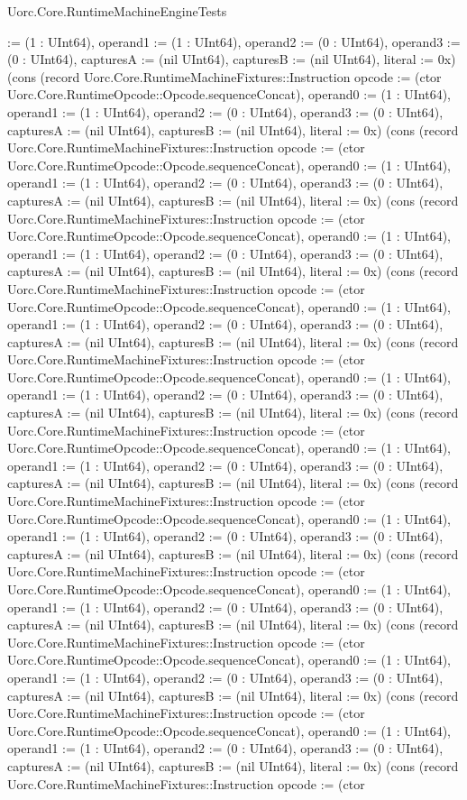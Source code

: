 \begin{lexlean}{Uorc.Core.RuntimeMachineEngineTests}
\begin{semanticmodule}
{:= (1 : UInt64), operand1 := (1 : UInt64), operand2 := (0 : UInt64), operand3 := (0 : UInt64), capturesA := (nil UInt64), capturesB := (nil UInt64), literal := 0x}) (cons (record Uorc.Core.RuntimeMachineFixtures::Instruction {opcode := (ctor Uorc.Core.RuntimeOpcode::Opcode.sequenceConcat), operand0 := (1 : UInt64), operand1 := (1 : UInt64), operand2 := (0 : UInt64), operand3 := (0 : UInt64), capturesA := (nil UInt64), capturesB := (nil UInt64), literal := 0x}) (cons (record Uorc.Core.RuntimeMachineFixtures::Instruction {opcode := (ctor Uorc.Core.RuntimeOpcode::Opcode.sequenceConcat), operand0 := (1 : UInt64), operand1 := (1 : UInt64), operand2 := (0 : UInt64), operand3 := (0 : UInt64), capturesA := (nil UInt64), capturesB := (nil UInt64), literal := 0x}) (cons (record Uorc.Core.RuntimeMachineFixtures::Instruction {opcode := (ctor Uorc.Core.RuntimeOpcode::Opcode.sequenceConcat), operand0 := (1 : UInt64), operand1 := (1 : UInt64), operand2 := (0 : UInt64), operand3 := (0 : UInt64), capturesA := (nil UInt64), capturesB := (nil UInt64), literal := 0x}) (cons (record Uorc.Core.RuntimeMachineFixtures::Instruction {opcode := (ctor Uorc.Core.RuntimeOpcode::Opcode.sequenceConcat), operand0 := (1 : UInt64), operand1 := (1 : UInt64), operand2 := (0 : UInt64), operand3 := (0 : UInt64), capturesA := (nil UInt64), capturesB := (nil UInt64), literal := 0x}) (cons (record Uorc.Core.RuntimeMachineFixtures::Instruction {opcode := (ctor Uorc.Core.RuntimeOpcode::Opcode.sequenceConcat), operand0 := (1 : UInt64), operand1 := (1 : UInt64), operand2 := (0 : UInt64), operand3 := (0 : UInt64), capturesA := (nil UInt64), capturesB := (nil UInt64), literal := 0x}) (cons (record Uorc.Core.RuntimeMachineFixtures::Instruction {opcode := (ctor Uorc.Core.RuntimeOpcode::Opcode.sequenceConcat), operand0 := (1 : UInt64), operand1 := (1 : UInt64), operand2 := (0 : UInt64), operand3 := (0 : UInt64), capturesA := (nil UInt64), capturesB := (nil UInt64), literal := 0x}) (cons (record Uorc.Core.RuntimeMachineFixtures::Instruction {opcode := (ctor Uorc.Core.RuntimeOpcode::Opcode.sequenceConcat), operand0 := (1 : UInt64), operand1 := (1 : UInt64), operand2 := (0 : UInt64), operand3 := (0 : UInt64), capturesA := (nil UInt64), capturesB := (nil UInt64), literal := 0x}) (cons (record Uorc.Core.RuntimeMachineFixtures::Instruction {opcode := (ctor Uorc.Core.RuntimeOpcode::Opcode.sequenceConcat), operand0 := (1 : UInt64), operand1 := (1 : UInt64), operand2 := (0 : UInt64), operand3 := (0 : UInt64), capturesA := (nil UInt64), capturesB := (nil UInt64), literal := 0x}) (cons (record Uorc.Core.RuntimeMachineFixtures::Instruction {opcode := (ctor Uorc.Core.RuntimeOpcode::Opcode.sequenceConcat), operand0 := (1 : UInt64), operand1 := (1 : UInt64), operand2 := (0 : UInt64), operand3 := (0 : UInt64), capturesA := (nil UInt64), capturesB := (nil UInt64), literal := 0x}) (cons (record Uorc.Core.RuntimeMachineFixtures::Instruction {opcode := (ctor Uorc.Core.RuntimeOpcode::Opcode.sequenceConcat), operand0 := (1 : UInt64), operand1 := (1 : UInt64), operand2 := (0 : UInt64), operand3 := (0 : UInt64), capturesA := (nil UInt64), capturesB := (nil UInt64), literal := 0x}) (cons (record Uorc.Core.RuntimeMachineFixtures::Instruction {opcode := (ctor }
\end{semanticmodule}
\end{lexlean}
